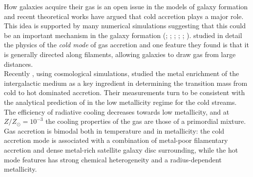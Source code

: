 \documentclass[12pt,preprint]{aastex}
\begin{document}
How galaxies acquire their gas is an open issue in the models of
galaxy formation and recent theoretical works have argued that cold
accretion plays a major role. This idea is supported by many numerical
simulations suggesting that this could be an important mechanism in
the galaxy formation (\citealt{Kat93}; \citealt{Kat94};
\citealt{Ker05}; \citealt{Dek06}; \citealt{Dek08}; \citealt{Bou09}).
\citet{Ker05} studied in detail the physics of the {\it cold mode}
of gas accretion and one feature they found is that it is generally
directed along filaments, allowing galaxies to draw gas from large
distances.\\ Recently \citet{Ocv08}, using cosmological simulations,
studied the metal enrichment of the intergalactic medium as a key
ingredient in determining the transition mass from cold to hot
dominated accretion.  Their measurements turn to be consistent with
the analytical prediction of \citet{Dek06} in the low metallicity
regime for the cold streams. The efficiency of radiative cooling
decreases towards low metallicity, and at $Z/Z_{\odot} = 10^{-3}$ the
cooling properties of the gas are those of a primordial mixture. Gas
accretion is bimodal both in temperature and in metallicity: the cold
accretion mode is associated with a combination of metal-poor
filamentary accretion and dense metal-rich satellite galaxy disc
surrounding, while the hot mode features has strong chemical
heterogeneity and a radius-dependent metallicity.
\end{document}
